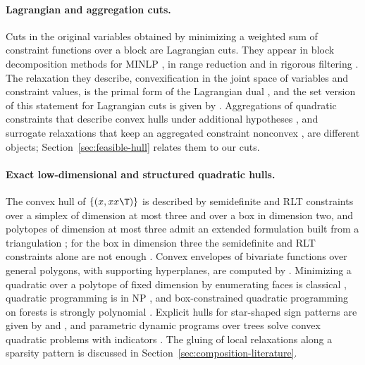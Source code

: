 \paragraph{Lagrangian and aggregation cuts.}
Cuts in the original variables obtained by minimizing a weighted sum of
constraint functions over a block are Lagrangian cuts. They appear in block
decomposition methods for MINLP \citep{Nowak2005,KaruppiahGrossmann2008,WuMutsNowakHendrix2025},
in range reduction \citep{TawarmalaniSahinidis2004,GleixnerEtAl2017} and in
rigorous filtering \citep{DomesNeumaier2016}. The relaxation they describe,
convexification in the joint space of variables and constraint values, is the
primal form of the Lagrangian dual
\citep{Falk1969,Geoffrion1974,FeltenmarkKiwiel2000,LemarechalRenaud2001}, and
the set version of this statement for Lagrangian cuts is given by
\citet{ChenLuedtke2022}. Aggregations of quadratic constraints that describe
convex hulls under additional hypotheses \citep{DeyMunozSerrano2022,BlekhermanDeySun2024},
and surrogate relaxations that keep an aggregated constraint nonconvex
\citep{MullerEtAl2022}, are different objects; Section~\ref{sec:feasible-hull}
relates them to our cuts.

\paragraph{Exact low-dimensional and structured quadratic hulls.}
The convex hull of $\{(x,xx\T)\}$ is described by semidefinite and RLT
constraints \citep{Shor1987,SheraliAdams1990} over a simplex of dimension at
most three and over a box in dimension two, and polytopes of dimension at
most three admit an extended formulation built from a triangulation
\citep{AnstreicherBurer2010}; for the box in dimension three the semidefinite
and RLT constraints alone are not enough \citep{AnstreicherBurer2010,BurerLetchford2009,Anstreicher2012}.
Convex envelopes of bivariate functions over general polygons, with
supporting hyperplanes, are computed by \citet{LocatelliSchoen2014}.
Minimizing a quadratic over a polytope of fixed dimension by enumerating
faces is classical \citep[Section~2.9]{Murty1997}, quadratic programming is in
NP \citep{Vavasis1990}, and box-constrained quadratic programming on forests
is strongly polynomial \citep{DelPiaKhajavirad2026}. Explicit hulls for
star-shaped sign patterns are given by \citet{DeyKhajavirad2025} and
\citet{Khajavirad2026}, and parametric dynamic programs over trees solve
convex quadratic problems with indicators \citep{BhathenaEtAl2025}. The
gluing of local relaxations along a sparsity pattern is discussed in
Section~\ref{sec:composition-literature}.

